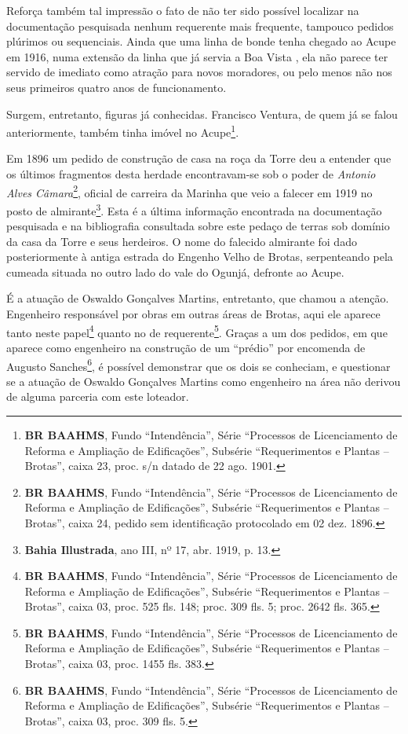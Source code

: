 



Reforça também tal impressão o fato de não ter sido possível localizar na documentação pesquisada nenhum requerente mais frequente, tampouco pedidos plúrimos ou sequenciais. Ainda que uma linha de bonde tenha chegado ao Acupe em 1916, numa extensão da linha que já servia a Boa Vista \cite[p.~384]{stiel_historia_1984}, ela não parece ter servido de imediato como atração para novos moradores, ou pelo menos não nos seus primeiros quatro anos de funcionamento.

Surgem, entretanto, figuras já conhecidas. Francisco Ventura, de quem já se falou anteriormente, também tinha imóvel no Acupe\footnote{\textbf{BR BAAHMS}, Fundo ``Intendência'', Série ``Processos de Licenciamento de Reforma e Ampliação de Edificações'', Subsérie ``Requerimentos e Plantas -- Brotas'', caixa 23, proc. s/n datado de 22 ago. 1901.}. 

Em 1896 um pedido de construção de casa na roça da Torre deu a entender que os últimos fragmentos desta herdade encontravam-se sob o poder de \textit{Antonio Alves Câmara}\footnote{\textbf{BR BAAHMS}, Fundo ``Intendência'', Série ``Processos de Licenciamento de Reforma e Ampliação de Edificações'', Subsérie ``Requerimentos e Plantas -- Brotas'', caixa 24, pedido sem identificação protocolado em 02 dez. 1896.}, oficial de carreira da Marinha que veio a falecer em 1919 no posto de almirante\footnote{\textbf{Bahia Illustrada}, ano III, nº 17, abr. 1919, p. 13.}. Esta é a última informação encontrada na documentação pesquisada e na bibliografia consultada sobre este pedaço de terras sob domínio da casa da Torre e seus herdeiros. O nome do falecido almirante foi dado posteriormente à antiga estrada do Engenho Velho de Brotas, serpenteando pela cumeada situada no outro lado do vale do Ogunjá, defronte ao Acupe.

É a atuação de Oswaldo Gonçalves Martins, entretanto, que chamou a atenção. Engenheiro responsável por obras em outras áreas de Brotas, aqui ele aparece tanto neste papel\footnote{\textbf{BR BAAHMS}, Fundo ``Intendência'', Série ``Processos de Licenciamento de Reforma e Ampliação de Edificações'', Subsérie ``Requerimentos e Plantas -- Brotas'', caixa 03, proc. 525 fls. 148; proc. 309 fls. 5; proc. 2642 fls. 365.} quanto no de requerente\footnote{\textbf{BR BAAHMS}, Fundo ``Intendência'', Série ``Processos de Licenciamento de Reforma e Ampliação de Edificações'', Subsérie ``Requerimentos e Plantas -- Brotas'', caixa 03, proc. 1455 fls. 383.}. Graças a um dos pedidos, em que aparece como engenheiro na construção de um ``prédio'' por encomenda de Augusto Sanches\footnote{\textbf{BR BAAHMS}, Fundo ``Intendência'', Série ``Processos de Licenciamento de Reforma e Ampliação de Edificações'', Subsérie ``Requerimentos e Plantas -- Brotas'', caixa 03, proc. 309 fls. 5.}, é possível demonstrar que os dois se conheciam, e questionar se a atuação de Oswaldo Gonçalves Martins como engenheiro na área não derivou de alguma parceria com este loteador.

